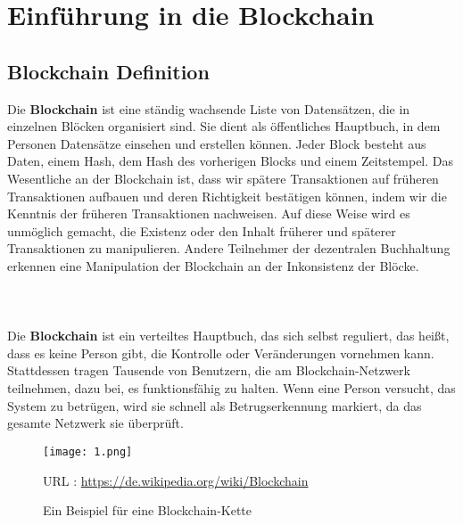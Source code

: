 \documentclass[ngerman]{scrreprt}
\begin{document}
\chapter{Einführung in die Blockchain}

\section{Blockchain Definition}
Die \textbf{Blockchain} ist eine ständig wachsende Liste von Datensätzen, die in einzelnen Blöcken organisiert sind. Sie dient als öffentliches Hauptbuch, in dem Personen Datensätze einsehen und erstellen können. Jeder Block besteht aus Daten, einem Hash, dem Hash des vorherigen Blocks und einem Zeitstempel. Das Wesentliche an der Blockchain ist, dass wir spätere Transaktionen auf früheren Transaktionen aufbauen und deren Richtigkeit bestätigen können, indem wir die Kenntnis der früheren Transaktionen nachweisen. Auf diese Weise wird es unmöglich gemacht, die Existenz oder den Inhalt früherer und späterer Transaktionen zu manipulieren. Andere Teilnehmer der dezentralen Buchhaltung erkennen eine Manipulation der Blockchain an der Inkonsistenz der Blöcke. \cite{businessinsider}\\ 
\\
\\
\\
Die \textbf{Blockchain} ist ein verteiltes Hauptbuch, das sich selbst reguliert, das heißt, dass es keine Person gibt, die Kontrolle oder Veränderungen vornehmen kann. Stattdessen tragen Tausende von Benutzern, die am Blockchain-Netzwerk teilnehmen, dazu bei, es funktionsfähig zu halten. Wenn eine Person versucht, das System zu betrügen, wird sie schnell als Betrugserkennung markiert, da das gesamte Netzwerk sie überprüft. \cite{iotforall_2022}

\begin{figure}[h!]
	\centering
	\texttt{[image: 1.png]}
	\caption{Ein Beispiel für eine Blockchain-Kette}
	\small URL : \url{https://de.wikipedia.org/wiki/Blockchain}
\end{figure} 
\end{document}
